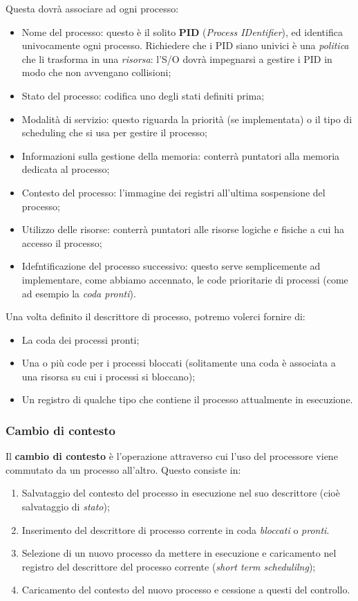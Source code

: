 \documentclass[a4paper,11pt]{article}
\begin{document}
Questa dovrà associare ad ogni processo:
\begin{itemize}
	\item Nome del processo: questo è il solito \textbf{PID} (\textit{Process IDentifier}), ed identifica univocamente ogni processo. Richiedere che i PID siano univici è una \textit{politica} che li trasforma in una \textit{risorsa}: l'S/O dovrà impegnarsi a gestire i PID in modo che non avvengano collisioni;
	\item Stato del processo: codifica uno degli stati definiti prima;
	\item Modalità di servizio: questo riguarda la priorità (se implementata) o il tipo di scheduling che si usa per gestire il processo;
	\item Informazioni sulla gestione della memoria: conterrà puntatori alla memoria dedicata al processo;
	\item Contesto del processo: l'immagine dei registri all'ultima sospensione del processo;
	\item Utilizzo delle risorse: conterrà puntatori alle risorse logiche e fisiche a cui ha accesso il processo;
	\item Idefntificazione del processo successivo: questo serve semplicemente ad implementare, come abbiamo accennato, le code prioritarie di processi (come ad esempio la \textit{coda pronti}).
\end{itemize}

Una volta definito il descrittore di processo, potremo volerci fornire di:
\begin{itemize}
	\item La coda dei processi pronti;
	\item Una o più code per i processi bloccati (solitamente una coda è associata a una risorsa su cui i processi si bloccano);
	\item Un registro di qualche tipo che contiene il processo attualmente in esecuzione. 
\end{itemize}

\subsubsection{Cambio di contesto}
Il \textbf{cambio di contesto} è l'operazione attraverso cui l'uso del processore viene commutato da un processo all'altro.
Questo consiste in:
\begin{enumerate}
	\item Salvataggio del contesto del processo in esecuzione nel suo descrittore (cioè salvataggio di \textit{stato});
	\item Inserimento del descrittore di processo corrente in coda \textit{bloccati} o \textit{pronti}.
	\item Selezione di un nuovo processo da mettere in esecuzione e caricamento nel registro del descrittore del processo corrente (\textit{short term schedulilng});
	\item Caricamento del contesto del nuovo processo e cessione a questi del controllo. 
\end{enumerate}
\end{document}
